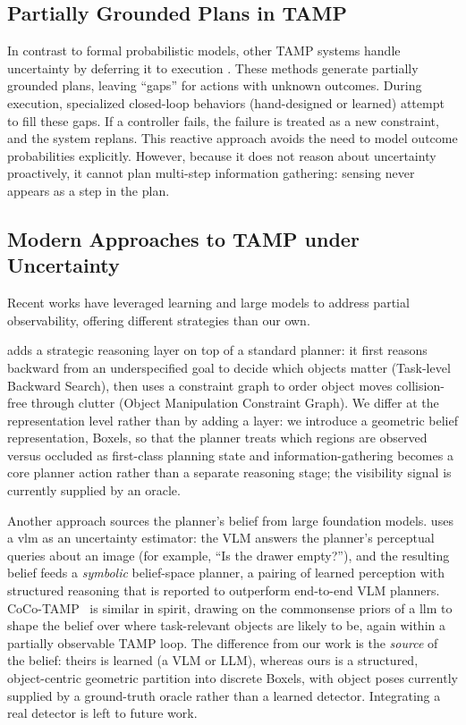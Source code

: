 \subsection{Partially Grounded Plans in TAMP}
In contrast to formal probabilistic models, other TAMP systems handle uncertainty by deferring it to execution \cite{pan2024task}. These methods generate partially grounded plans, leaving ``gaps'' for actions with unknown outcomes. During execution, specialized closed-loop behaviors (hand-designed or learned) attempt to fill these gaps. If a controller fails, the failure is treated as a new constraint, and the system replans. This reactive approach avoids the need to model outcome probabilities explicitly. However, because it does not reason about uncertainty proactively, it cannot plan multi-step information gathering: sensing never appears as a step in the plan.

\subsection{Modern Approaches to TAMP under Uncertainty}
Recent works have leveraged learning and large models to address partial observability, offering different strategies than our own.

\cite{ma2025task} adds a strategic reasoning layer on top of a standard planner: it first reasons backward from an underspecified goal to decide which objects matter (Task-level Backward Search), then uses a constraint graph to order object moves collision-free through clutter (Object Manipulation Constraint Graph). We differ at the representation level rather than by adding a layer: we introduce a geometric belief representation, Boxels, so that the planner treats which regions are observed versus occluded as first-class planning state and information-gathering becomes a core planner action rather than a separate reasoning stage; the visibility signal is currently supplied by an oracle.

Another approach sources the planner's belief from large foundation models. \cite{zhao2025seeing} uses a \ac{vlm} as an uncertainty estimator: the VLM answers the planner's perceptual queries about an image (for example, ``Is the drawer empty?''), and the resulting belief feeds a \emph{symbolic} belief-space planner, a pairing of learned perception with structured reasoning that is reported to outperform end-to-end VLM planners. CoCo-TAMP~\cite{kim2026llmguided} is similar in spirit, drawing on the commonsense priors of a \ac{llm} to shape the belief over where task-relevant objects are likely to be, again within a partially observable TAMP loop. The difference from our work is the \emph{source} of the belief: theirs is learned (a VLM or LLM), whereas ours is a structured, object-centric geometric partition into discrete Boxels, with object poses currently supplied by a ground-truth oracle rather than a learned detector. Integrating a real detector is left to future work.

